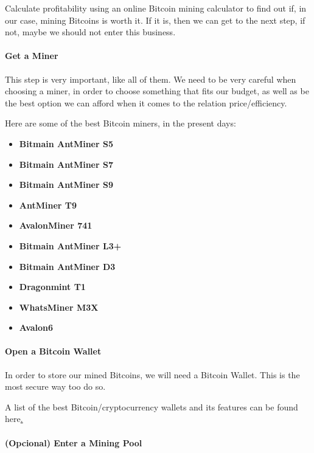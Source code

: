 \documentclass{article}
\newcommand\tab[1][1cm]{\hspace*{#1}}
\begin{document}
\tab Calculate profitability using an online Bitcoin mining calculator to find out if, in our case, mining Bitcoins is worth it. If it is, then we can get to the next step, if not, maybe we should not enter this business.

\paragraph{Get a Miner}

\tab This step is very important, like all of them. We need to be very careful when choosing a miner, in order to choose something that fits our budget, as well as be the best option we can afford when it comes to the relation price/efficiency.

Here are some of the best Bitcoin miners, in the present days:

\begin{itemize}
    \item \textbf{Bitmain AntMiner S5}
    \item \textbf{Bitmain AntMiner S7}
    \item \textbf{Bitmain AntMiner S9}
    \item \textbf{AntMiner T9}
    \item \textbf{AvalonMiner 741}
    \item \textbf{Bitmain AntMiner L3+}
    \item \textbf{Bitmain AntMiner D3}
    \item \textbf{Dragonmint T1}
    \item \textbf{WhatsMiner M3X}
    \item \textbf{Avalon6}
\end{itemize}

\newpage

\paragraph{Open a Bitcoin Wallet}

\tab In order to store our mined Bitcoins, we will need a Bitcoin Wallet. This is the most secure way too do so.

A list of the best Bitcoin/cryptocurrency wallets and its features can be found here\hyperlink{https://www.guru99.com/best-bitcoin-cryptocurrency-wallets.html}.

\paragraph{(Opcional) Enter a Mining Pool}
\end{document}
